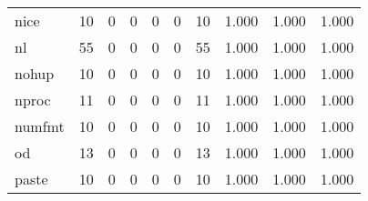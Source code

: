 \begin{longtable}{lp{1.3cm}p{1.3cm}p{1.3cm}p{1.3cm}p{1.3cm}p{1.3cm}p{1.3cm}p{1.3cm}p{1.3cm}}
nice      &                     10 &                                             0 &                                            0 &                                           0 &                                            0 &                                         10 &                                1.000 &                                  1.000 &                                1.000 \\
nl        &                     55 &                                             0 &                                            0 &                                           0 &                                            0 &                                         55 &                                1.000 &                                  1.000 &                                1.000 \\
nohup     &                     10 &                                             0 &                                            0 &                                           0 &                                            0 &                                         10 &                                1.000 &                                  1.000 &                                1.000 \\
nproc     &                     11 &                                             0 &                                            0 &                                           0 &                                            0 &                                         11 &                                1.000 &                                  1.000 &                                1.000 \\
numfmt    &                     10 &                                             0 &                                            0 &                                           0 &                                            0 &                                         10 &                                1.000 &                                  1.000 &                                1.000 \\
od        &                     13 &                                             0 &                                            0 &                                           0 &                                            0 &                                         13 &                                1.000 &                                  1.000 &                                1.000 \\
paste     &                     10 &                                             0 &                                            0 &                                           0 &                                            0 &                                         10 &                                1.000 &                                  1.000 &                                1.000 \\

\end{longtable}
